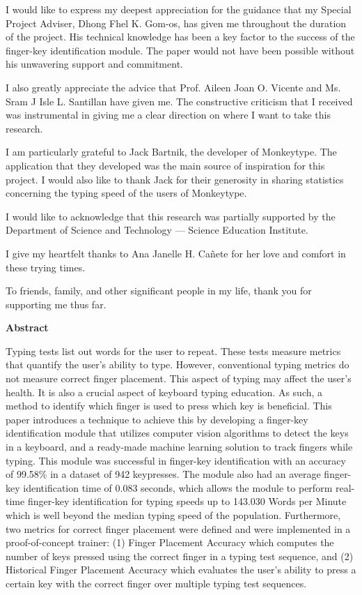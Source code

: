 \documentclass{report}
\begin{document}
I would like to express my deepest appreciation for the guidance that my Special
Project Adviser, Dhong Fhel K. Gom-os, has given me throughout the duration of
the project. His technical knowledge has been a key factor to the success of the
finger-key identification module. The paper would not have been possible without
his unwavering support and commitment.

I also greatly appreciate the advice that Prof. Aileen Joan O. Vicente and Ms.
Sram J Isle L. Santillan have given me. The constructive criticism that I
received was instrumental in giving me a clear direction on where I want to take
this research.

I am particularly grateful to Jack Bartnik, the developer of Monkeytype. The
application that they developed was the main source of inspiration for this
project. I would also like to thank Jack for their generosity in sharing
statistics concerning the typing speed of the users of Monkeytype.

I would like to acknowledge that this research was partially supported by the
Department of Science and Technology --- Science Education Institute.

I give my heartfelt thanks to Ana Janelle H. Ca\~{n}ete for her love and comfort
in these trying times.

To friends, family, and other significant people in my life, thank you for
supporting me thus far.

\newpage
{}
\begin{center}
	\LARGE\textbf{Abstract}
\end{center}

Typing tests list out words for the user to repeat. These tests measure metrics
that quantify the user's ability to type. However, conventional typing metrics
do not measure correct finger placement. This aspect of typing may affect the
user's health. It is also a crucial aspect of keyboard typing education. As
such, a method to identify which finger is used to press which key is
beneficial. This paper introduces a technique to achieve this by developing a
finger-key identification module that utilizes computer vision algorithms to
detect the keys in a keyboard, and a ready-made machine learning solution to
track fingers while typing. This module was successful in finger-key
identification with an accuracy of 99.58\% in a dataset of 942 keypresses. The
module also had an average finger-key identification time of 0.083 seconds,
which allows the module to perform real-time finger-key identification for
typing speeds up to 143.030 Words per Minute which is well beyond the median
typing speed of the population. Furthermore, two metrics for correct finger
placement were defined and were implemented in a proof-of-concept trainer: (1)
Finger Placement Accuracy which computes the number of keys pressed using the
correct finger in a typing test sequence, and (2) Historical Finger Placement
Accuracy which evaluates the user's ability to press a certain key with the
correct finger over multiple typing test sequences.
\end{document}
